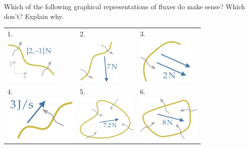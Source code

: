 \documentclass[a4paper,12pt,%
onecolumn,oneside,%
british%
]{memoir}
\renewcommand*{\|}[1][]{\nonscript\:#1\vert\nonscript\:\mathopen{}}
\begin{document}
Which of the following graphical representations of fluxes do make sense? Which don't? Explain why.\noprelistbreak

\renewcommand{\tabularxcolumn}[1]{>{\bfseries}w{c}{0.3\linewidth}}
\begin{tabularx}{\linewidth}[h]{XXX}
1.&2.&3.
\\
  \includegraphics[align=c, height=6em,width=0.25\linewidth,keepaspectratio]{images/flux_vector_1.jpg}
&  \includegraphics[align=c, height=6em,width=0.25\linewidth,keepaspectratio]{images/flux_vector_2.jpg}
&  \includegraphics[align=c,
height=6em,width=0.25\linewidth,keepaspectratio]{images/flux_vector_3.jpg}
\\[10ex]
4.&5.&6.
\\
  \includegraphics[align=c, height=6em,width=0.25\linewidth,keepaspectratio]{images/flux_vector_4.jpg}
&  \includegraphics[align=c, height=6em,width=0.25\linewidth,keepaspectratio]{images/flux_vector_5.jpg}
&  \includegraphics[align=c, height=6em,width=0.25\linewidth,keepaspectratio]{images/flux_vector_8.jpg}

\end{tabularx}
\end{document}
